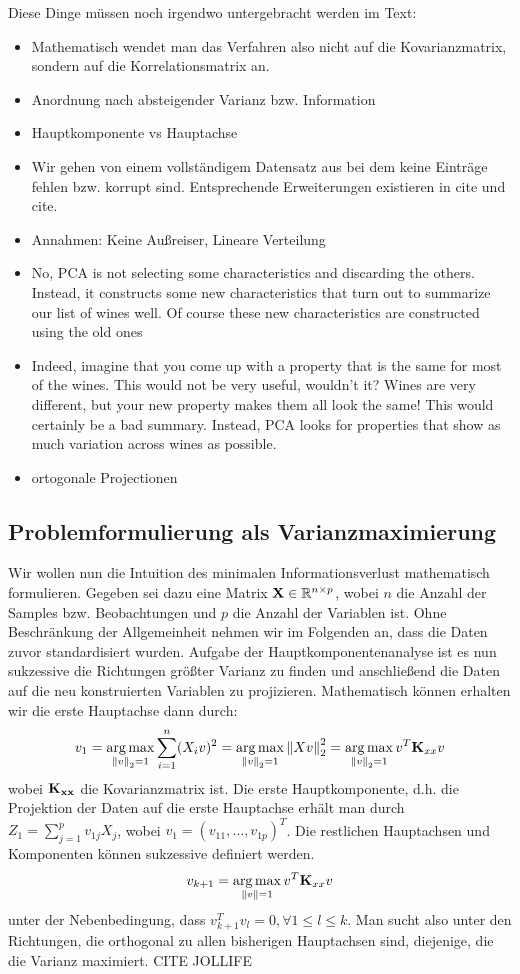 Diese Dinge müssen noch irgendwo untergebracht werden im Text:
\begin{itemize}
\item Mathematisch wendet man das Verfahren also nicht auf die Kovarianzmatrix, sondern auf die Korrelationsmatrix an.
\item Anordnung nach absteigender Varianz bzw. Information
\item Hauptkomponente vs Hauptachse
\item Wir gehen von einem vollständigem Datensatz aus bei dem keine Einträge fehlen bzw. korrupt sind. Entsprechende Erweiterungen existieren in cite und cite. 
\item Annahmen: Keine Außreiser, Lineare Verteilung
\item No, PCA is not selecting some characteristics and discarding the others. Instead, it constructs some new characteristics that turn out to summarize our list of wines well. Of course these new characteristics are constructed using the old ones
\item Indeed, imagine that you come up with a property that is the same for most of the wines. This would not be very useful, wouldn't it? Wines are very different, but your new property makes them all look the same! This would certainly be a bad summary. Instead, PCA looks for properties that show as much variation across wines as possible.
\item ortogonale Projectionen
\end{itemize}


\subsection{Problemformulierung als Varianzmaximierung}

Wir wollen nun die Intuition des minimalen Informationsverlust mathematisch formulieren. Gegeben sei dazu eine Matrix $\mathbf{X} \in \mathbb{R}^{n\times p}$, wobei $n$ die Anzahl der Samples bzw. Beobachtungen und $p$ die Anzahl der Variablen ist. Ohne Beschränkung der Allgemeinheit nehmen wir im Folgenden an, dass die Daten zuvor standardisiert wurden.
Aufgabe der Hauptkomponentenanalyse ist es nun sukzessive die Richtungen größter Varianz zu finden und anschließend die Daten auf die neu konstruierten Variablen zu projizieren. Mathematisch können erhalten wir die erste Hauptachse dann durch:
$$v_1 = \operatorname*{arg\,max}_{\left\lVert v \right\rVert_2 = 1} \sum_{i=1}^n(X_iv)^2 = \operatorname*{arg\,max}_{\left\lVert v \right\rVert_2 = 1} \left\lVert Xv \right\rVert_2^2 = \operatorname*{arg\,max}_{\left\lVert v \right\rVert_2 = 1} v^T \mathbf{K}_{xx} v$$
wobei $\mathbf{K_{xx}}$ die Kovarianzmatrix ist. Die erste Hauptkomponente, d.h. die Projektion der Daten auf die erste Hauptachse erhält man durch $Z_1 = \sum_{j=1}^{p} v_{1j}X_j$, wobei $v_1 = (v_{11}, \ldots, v_{1p})^T$. Die restlichen Hauptachsen und Komponenten können sukzessive definiert werden.
$$v_{k+1} = \operatorname*{arg\,max}_{\left\lVert v \right\rVert = 1} v^T \mathbf{K}_{xx} v$$ unter der Nebenbedingung, dass $v_{k+1}^Tv_l = 0, \forall 1 \leq l \leq k$. Man sucht also unter den Richtungen, die orthogonal zu allen bisherigen Hauptachsen sind, diejenige, die die Varianz maximiert.
\cite{zou_overview}
CITE JOLLIFE

